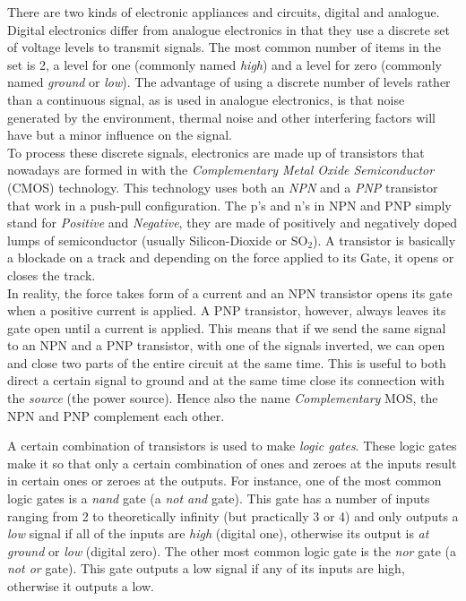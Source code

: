 \documentclass[11pt,british]{article}
\begin{document}
There are two kinds of electronic appliances and circuits, digital
and analogue. Digital electronics differ from analogue electronics
in that they use a discrete set of voltage levels to transmit signals.
The most common number of items in the set is 2, a level for one (commonly
named \emph{high}) and a level for zero (commonly named \emph{ground}
or \emph{low}). The advantage of using a discrete number of levels
rather than a continuous signal, as is used in analogue electronics,
is that noise generated by the environment, thermal noise and other
interfering factors will have but a minor influence on the signal.\\


To process these discrete signals, electronics are made up of transistors
that nowadays are formed in with the \emph{Complementary Metal Oxide
Semiconductor }(CMOS) technology. This technology uses both an \emph{NPN}
and a \emph{PNP} transistor that work in a push-pull configuration.
The p's and n's in NPN and PNP simply stand for \emph{Positive} and
\emph{Negative}, they are made of positively and negatively doped lumps
of semiconductor (usually Silicon-Dioxide or SO$_{2}$). A transistor
is basically a blockade on a track and depending on the force applied
to its Gate, it opens or closes the track.\\


In reality, the force takes form of a current and an NPN transistor
opens its gate when a positive current is applied. A PNP transistor,
however, always leaves its gate open until a current is applied. This
means that if we send the same signal to an NPN and a PNP transistor,
with one of the signals inverted, we can open and close two parts
of the entire circuit at the same time. This is useful to both direct
a certain signal to ground and at the same time close its connection
with the \emph{source} (the power source). Hence also the name \emph{Complementary}
MOS, the NPN and PNP complement each other.

A certain combination of transistors is used to make \emph{logic gates}.
These logic gates make it so that only a certain combination of ones
and zeroes at the inputs result in certain ones or zeroes at the outputs.
For instance, one of the most common logic gates is a \emph{nand }gate
(a \emph{not and }gate). This gate has a number of inputs ranging
from 2 to theoretically infinity (but practically 3 or 4) and only
outputs a \emph{low} signal if all of the inputs are \emph{high} (digital
one), otherwise its output is \emph{at ground} or \emph{low} (digital
zero). The other most common logic gate is the \emph{nor }gate (a
\emph{not or }gate). This gate outputs a low signal if any of its
inputs are high, otherwise it outputs a low.
\end{document}
